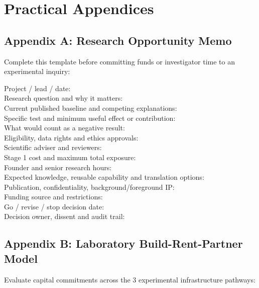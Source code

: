 \section{Practical Appendices}

\subsection{Appendix A: Research Opportunity Memo}

Complete this template before committing funds or investigator time to an experimental inquiry:

\begin{tcolorbox}[colback=BayesCanvas,colframe=BayesDark,arc=1mm,title=\textbf{Appendix A: Research Opportunity Memo}]
\scriptsize\ttfamily\raggedright
Project / lead / date:\\[2pt]
Research question and why it matters:\\[2pt]
Current published baseline and competing explanations:\\[2pt]
Specific test and minimum useful effect or contribution:\\[2pt]
What would count as a negative result:\\[2pt]
Eligibility, data rights and ethics approvals:\\[2pt]
Scientific adviser and reviewers:\\[2pt]
Stage 1 cost and maximum total exposure:\\[2pt]
Founder and senior research hours:\\[2pt]
Expected knowledge, reusable capability and translation options:\\[2pt]
Publication, confidentiality, background/foreground IP:\\[2pt]
Funding source and restrictions:\\[2pt]
Go / revise / stop decision date:\\[2pt]
Decision owner, dissent and audit trail:
\end{tcolorbox}

\subsection{Appendix B: Laboratory Build-Rent-Partner Model}

Evaluate capital commitments across the 3 experimental infrastructure pathways:


